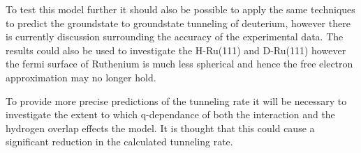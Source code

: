 To test
this model further
it should also be possible
to apply the same
techniques
to predict the
groundstate to
groundstate tunneling
of deuterium, however
there is currently
discussion
surrounding the
accuracy of the
experimental data.
The results could
also be used to
investigate the
H-Ru(111) and D-Ru(111) %
however the fermi
surface of Ruthenium
is much less spherical
and hence
the free electron
approximation may
no longer hold.

To provide more precise
predictions of the
tunneling rate
it will be necessary
to investigate the
extent to which q-dependance
of both the interaction
and the hydrogen overlap
effects the model. It is thought
that this could cause a
significant reduction in
the calculated tunneling
rate.





